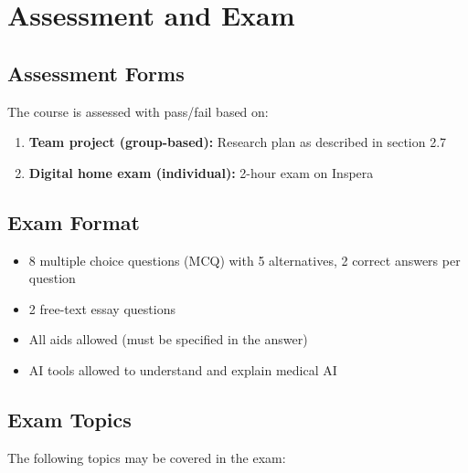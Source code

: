\documentclass[11pt,a4paper]{article}
\begin{document}
\section{Assessment and Exam}

\subsection{Assessment Forms}

The course is assessed with pass/fail based on:

\begin{enumerate}
    \item \textbf{Team project (group-based):} Research plan as described in section 2.7
    \item \textbf{Digital home exam (individual):} 2-hour exam on Inspera
\end{enumerate}

\subsection{Exam Format}

\begin{itemize}[nosep]
    \item 8 multiple choice questions (MCQ) with 5 alternatives, 2 correct answers per question
    \item 2 free-text essay questions
    \item All aids allowed (must be specified in the answer)
    \item AI tools allowed to understand and explain medical AI
\end{itemize}

\subsection{Exam Topics}

The following topics may be covered in the exam:
\end{document}
